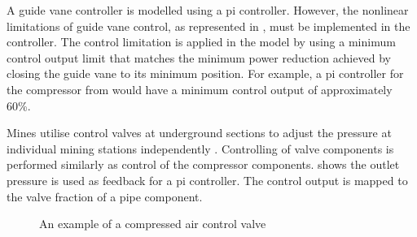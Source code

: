 		A guide vane controller is modelled using a \gls{pi} controller. However, the nonlinear limitations of guide vane control, as represented in , must be implemented in the controller. The control limitation is applied in the model by using a minimum control output limit that matches the minimum power reduction achieved by closing the guide vane to its minimum position. For example, a \gls{pi} controller for the compressor from  would have a minimum control output of approximately 60\%.
		\par 
		Mines utilise control valves at underground sections to adjust the pressure at individual mining stations independently \cite{Heyns2014Masters}. Controlling of valve components is performed similarly as control of the compressor components.  shows the outlet pressure is used as feedback for a \gls{pi} controller. The control output is mapped to the valve fraction of a pipe component.
		\begin{figure}[h]
			\centering
			\caption[An example of a compressed air control valve]{An example of a compressed air control valve\cite{van2015implementation}} 
			\label{fig: Control}
		\end{figure}
